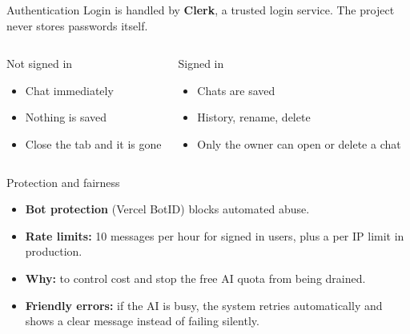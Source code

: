 \documentclass[aspectratio=169,11pt]{beamer}
\newcommand{\key}[1]{\textcolor{ember}{\textbf{#1}}}
\begin{document}
\begin{frame}{Authentication}
  Login is handled by \key{Clerk}, a trusted login service. The project never stores passwords itself.
  \vspace{0.3cm}
  \begin{columns}[T]
      \begin{block}{Not signed in}
        \begin{itemize}
          \item Chat immediately
          \item Nothing is saved
          \item Close the tab and it is gone
        \end{itemize}
      \end{block}
      \begin{block}{Signed in}
        \begin{itemize}
          \item Chats are saved
          \item History, rename, delete
          \item Only the owner can open or delete a chat
        \end{itemize}
      \end{block}
  \end{columns}
  \vspace{0.2cm}
\end{frame}

\begin{frame}{Protection and fairness}
  \begin{itemize}
    \item \key{Bot protection} (Vercel BotID) blocks automated abuse.
    \item \key{Rate limits:} 10 messages per hour for signed in users, plus a per IP limit in production.
    \item \key{Why:} to control cost and stop the free AI quota from being drained.
    \item \key{Friendly errors:} if the AI is busy, the system retries automatically and shows a clear message instead of failing silently.
  \end{itemize}
\end{frame}
\end{document}
